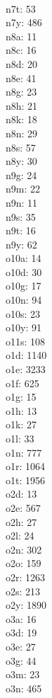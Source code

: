 \begin{multicols}{8}
  \\n7t: 53
  \\n7y: 486
  \\n8a: 11
  \\n8c: 16
  \\n8d: 20
  \\n8e: 41
  \\n8g: 23
  \\n8h: 21
  \\n8k: 18
  \\n8n: 29
  \\n8s: 57
  \\n8y: 30
  \\n9g: 24
  \\n9m: 22
  \\n9n: 11
  \\n9s: 35
  \\n9t: 16
  \\n9y: 62
  \\o10a: 14
  \\o10d: 30
  \\o10g: 17
  \\o10n: 94
  \\o10s: 23
  \\o10y: 91
  \\o11s: 108
  \\o1d: 1140
  \\o1e: 3233
  \\o1f: 625
  \\o1g: 15
  \\o1h: 13
  \\o1k: 27
  \\o1l: 33
  \\o1n: 777
  \\o1r: 1064
  \\o1t: 1956
  \\o2d: 13
  \\o2e: 567
  \\o2h: 27
  \\o2l: 24
  \\o2n: 302
  \\o2o: 159
  \\o2r: 1263
  \\o2s: 213
  \\o2y: 1890
  \\o3a: 16
  \\o3d: 19
  \\o3e: 27
  \\o3g: 44
  \\o3m: 23
  \\o3n: 465

\end{multicols}
